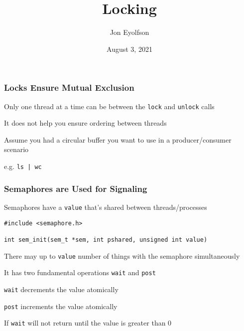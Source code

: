 

\title{Locking}
\author{Jon Eyolfson}
\date{August 3, 2021}


  \begin{frame}
    \titlepage
  \end{frame}

  \begin{frame}
    \frametitle{Locks Ensure Mutual Exclusion}

    Only one thread at a time can be between the \texttt{lock} and
    \texttt{unlock} calls

    \vspace{2em}

    It does not help you ensure ordering between threads

    \vspace{2em}

    Assume you had a circular buffer you want to use in a producer/consumer
    scenario

    \hspace{2em} e.g. \texttt{ls | wc}
  \end{frame}

  \begin{frame}[fragile]
    \frametitle{Semaphores are Used for Signaling}

    Semaphores have a {\tt value} that's shared between threads/processes

    \vspace{2em}

    \begin{lstlisting}
#include <semaphore.h>

int sem_init(sem_t *sem, int pshared, unsigned int value)
    \end{lstlisting}

    \vspace{2em}

    There may up to \texttt{value} number of things with the semaphore
    simultaneously

    \vspace{2em}

    It has two fundamental operations {\tt wait} and {\tt post}

    \hspace{2em} \texttt{wait} decrements the value atomically

    \hspace{2em} \texttt{post} increments the value atomically

    \vspace{2em}

    If \texttt{wait} will not return until the value is greater than 0
  \end{frame}

